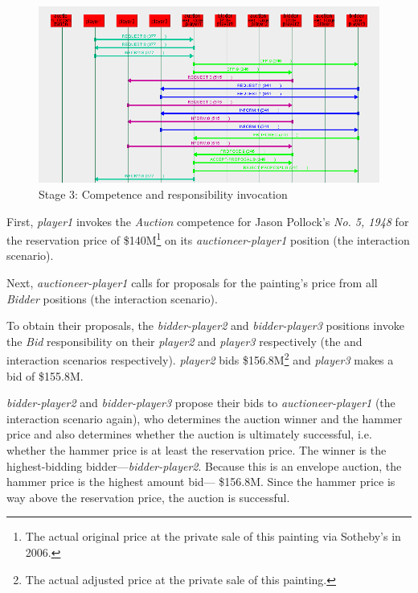 \begin{figure}[H]
	\centering
	\includegraphics[width=\textwidth]{images/examples/example3-stageA3.png}
	\caption{Stage 3: Competence and responsibility invocation}
	\label{figure:example3-stageA3}
\end{figure}

First, \textit{player1} invokes the \textit{Auction} competence for Jason Pollock's \textit{No. 5, 1948} for the reservation price of \$140M\footnote{The actual original price at the private sale of this painting via Sotheby's in 2006.} on its \textit{auctioneer-player1} position (the {} interaction scenario).

Next, \textit{auctioneer-player1} calls for proposals for the painting's price from all \textit{Bidder} positions (the {} interaction scenario).

To obtain their proposals, the \textit{bidder-player2} and \textit{bidder-player3} positions invoke the \textit{Bid} responsibility on their \textit{player2} and \textit{player3} respectively (the {} and {} interaction scenarios respectively).
\textit{player2} bids \$156.8M\footnote{The actual adjusted price at the private sale of this painting.} and \textit{player3} makes a bid of \$155.8M.

\textit{bidder-player2} and \textit{bidder-player3} propose their bids to \textit{auctioneer-player1} (the {} interaction scenario again), who determines the auction winner and the hammer price and also determines whether the auction is ultimately successful, i.e. whether the hammer price is at least the reservation price.
The winner is the highest-bidding bidder---\textit{bidder-player2}.
Because this is an envelope auction, the hammer price is the highest amount bid--- \$156.8M.
Since the hammer price is way above the reservation price, the auction is successful.


